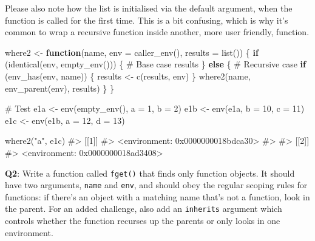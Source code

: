 \documentclass[
]{krantz}
\makeatletter
\newenvironment{Shaded}{\begin{snugshade}}{\end{snugshade}}
\newcommand{\CommentTok}[1]{\textcolor[rgb]{0.56,0.35,0.01}{\textit{#1}}}
\newcommand{\ControlFlowTok}[1]{\textcolor[rgb]{0.13,0.29,0.53}{\textbf{#1}}}
\newcommand{\DataTypeTok}[1]{\textcolor[rgb]{0.13,0.29,0.53}{#1}}
\newcommand{\DecValTok}[1]{\textcolor[rgb]{0.00,0.00,0.81}{#1}}
\newcommand{\KeywordTok}[1]{\textcolor[rgb]{0.13,0.29,0.53}{\textbf{#1}}}
\newcommand{\NormalTok}[1]{#1}
\newcommand{\StringTok}[1]{\textcolor[rgb]{0.31,0.60,0.02}{#1}}
\newenvironment{kframe}{%
\medskip{}
\setlength{\fboxsep}{.8em}
 \def\at@end@of@kframe{}%
 \ifinner\ifhmode%
  \def\at@end@of@kframe{\end{minipage}}%
  \begin{minipage}{\columnwidth}%
 \fi\fi%
 \def\FrameCommand##1{\hskip\@totalleftmargin \hskip-\fboxsep
 \colorbox{shadecolor}{##1}\hskip-\fboxsep
     \hskip-\linewidth \hskip-\@totalleftmargin \hskip\columnwidth}%
 \MakeFramed {\advance\hsize-\width
   \@totalleftmargin\z@ \linewidth\hsize
   \@setminipage}}%
 {\par\unskip\endMakeFramed%
 \at@end@of@kframe}
\renewenvironment{Shaded}{\begin{kframe}}{\end{kframe}}
\renewcommand{\KeywordTok} [1]{\textcolor[rgb]{0.00,0.44,0.13}{{#1}}}
\renewcommand{\DataTypeTok}[1]{\textcolor[rgb]{0.56,0.13,0.00}{{#1}}}
\renewcommand{\DecValTok}  [1]{\textcolor[rgb]{0.25,0.63,0.44}{{#1}}}
\renewcommand{\StringTok}  [1]{\textcolor[rgb]{0.25,0.44,0.63}{{#1}}}
\renewcommand{\CommentTok} [1]{\textcolor[rgb]{0.38,0.63,0.69}{{#1}}}
\renewcommand{\NormalTok}  [1]{{#1}}
\makeatother
\begin{document}
Please also note how the list is initialised via the default argument, when the function is called for the first time. This is a bit confusing, which is why it's common to wrap a recursive function inside another, more user friendly, function.

\begin{Shaded}
\begin{Highlighting}[]
\NormalTok{where2 <-}\StringTok{ }\ControlFlowTok{function}\NormalTok{(name, }\DataTypeTok{env =} \KeywordTok{caller_env}\NormalTok{(), }\DataTypeTok{results =} \KeywordTok{list}\NormalTok{()) \{}
  \ControlFlowTok{if}\NormalTok{ (}\KeywordTok{identical}\NormalTok{(env, }\KeywordTok{empty_env}\NormalTok{())) \{}
    \CommentTok{# Base case}
\NormalTok{    results}
\NormalTok{  \} }\ControlFlowTok{else}\NormalTok{ \{}
    \CommentTok{# Recursive case}
    \ControlFlowTok{if}\NormalTok{ (}\KeywordTok{env_has}\NormalTok{(env, name)) \{}
\NormalTok{      results <-}\StringTok{ }\KeywordTok{c}\NormalTok{(results, env)}
\NormalTok{    \}}
    \KeywordTok{where2}\NormalTok{(name, }\KeywordTok{env_parent}\NormalTok{(env), results)}
\NormalTok{  \}}
\NormalTok{\}}

\CommentTok{# Test}
\NormalTok{e1a <-}\StringTok{ }\KeywordTok{env}\NormalTok{(}\KeywordTok{empty_env}\NormalTok{(), }\DataTypeTok{a =} \DecValTok{1}\NormalTok{, }\DataTypeTok{b =} \DecValTok{2}\NormalTok{)}
\NormalTok{e1b <-}\StringTok{ }\KeywordTok{env}\NormalTok{(e1a, }\DataTypeTok{b =} \DecValTok{10}\NormalTok{, }\DataTypeTok{c =} \DecValTok{11}\NormalTok{)}
\NormalTok{e1c <-}\StringTok{ }\KeywordTok{env}\NormalTok{(e1b, }\DataTypeTok{a =} \DecValTok{12}\NormalTok{, }\DataTypeTok{d =} \DecValTok{13}\NormalTok{)}

\KeywordTok{where2}\NormalTok{(}\StringTok{"a"}\NormalTok{, e1c)}
\CommentTok{#> [[1]]}
\CommentTok{#> <environment: 0x0000000018bdca30>}
\CommentTok{#> }
\CommentTok{#> [[2]]}
\CommentTok{#> <environment: 0x0000000018ad3408>}
\end{Highlighting}
\end{Shaded}

\textbf{{Q2}}: Write a function called \texttt{fget()} that finds only function objects. It should have two arguments, \texttt{name} and \texttt{env}, and should obey the regular scoping rules for functions: if there's an object with a matching name that's not a function, look in the parent. For an added challenge, also add an \texttt{inherits} argument which controls whether the function recurses up the parents or only looks in one environment.
\end{document}

